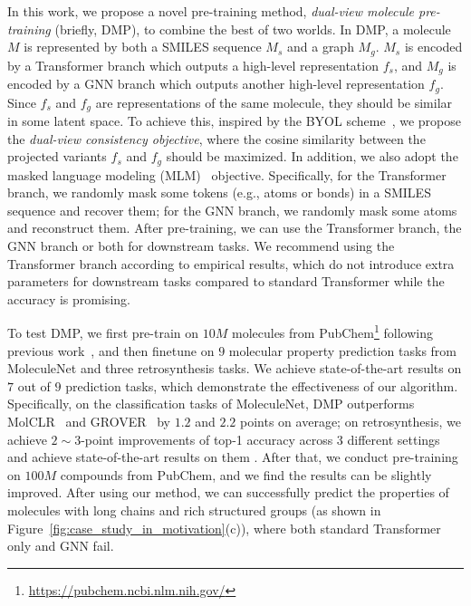 \documentclass{article}
\newcommand{\ourM}{DMP}
\begin{document}
In this work, we propose a novel pre-training method, {\it dual-view molecule pre-training} (briefly, \ourM{}), to combine the best of two worlds. In \ourM{}, a molecule $M$ is represented by both a SMILES sequence $M_s$ and a graph $M_g$. $M_s$ is encoded by a Transformer branch which outputs a high-level representation $f_s$, and $M_g$ is encoded by a GNN branch which outputs another high-level representation $f_g$. Since $f_s$ and $f_g$ are representations of the same molecule, they should be similar in some latent space. To achieve this, inspired by the BYOL scheme~\cite{BYOL2020}, we propose the {\it dual-view consistency objective}, where the cosine similarity between the projected variants $f_s$ and $f_g$ should be maximized. In addition, we also adopt the masked language modeling (MLM)~\cite{hu2019strategies,chithrananda2020chemberta,devlin2018bert} objective. Specifically, for the Transformer branch, we randomly mask some tokens (e.g., atoms or bonds) in a SMILES sequence and recover them; for the GNN branch, we randomly mask some atoms and reconstruct them. After pre-training, we can use the Transformer branch, the GNN branch or both for downstream tasks. We recommend using the Transformer branch according to empirical results, which do not introduce extra parameters for downstream tasks compared to standard Transformer while the accuracy is promising. 

To test \ourM{}, we first pre-train on $10M$ molecules from PubChem\footnote{\url{https://pubchem.ncbi.nlm.nih.gov/}} following previous work~\cite{chithrananda2020chemberta,wang2021molclr}, and then finetune on $9$ molecular property prediction tasks from MoleculeNet \citep{wu2018moleculenet} and three retrosynthesis tasks. We achieve state-of-the-art results on $7$ out of $9$ prediction tasks, which demonstrate the effectiveness of our algorithm. Specifically, on the classification tasks of MoleculeNet, \ourM{} outperforms MolCLR~\cite{wang2021molclr} and GROVER~\cite{rong2020self} by $1.2$ and $2.2$ points on average; on retrosynthesis, we  achieve $2\sim 3$-point improvements of top-1 accuracy across 3 different settings and achieve state-of-the-art results on them \citep{GLN,NEURIPS2020_819f46e5,tetko2020state}. After that, we conduct pre-training on $100M$ compounds from PubChem, and we find the results can be slightly improved. After using our method, we can successfully predict the properties 
of molecules with long chains and rich structured groups (as shown in Figure~\ref{fig:case_study_in_motivation}(c)), where both standard Transformer only and GNN fail.
\end{document}
